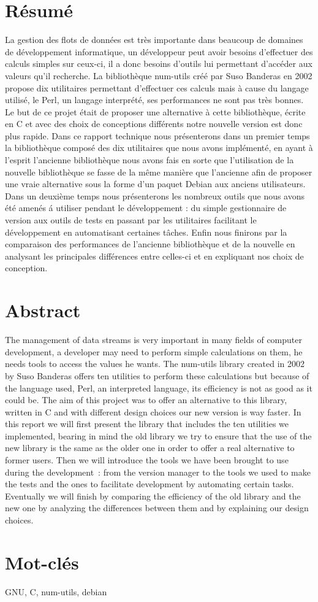 \section*{R\'esum\'e}

La gestion des flots de donn\'ees est tr\`es importante dans beaucoup de domaines de d\'eveloppement informatique, un d\'eveloppeur peut avoir besoins d'effectuer des calculs simples sur ceux-ci, il a donc besoins d'outils lui permettant d'acc\'eder aux valeurs qu'il recherche. La biblioth\`eque num-utils cr\'e\'e par Suso Banderas en 2002 propose dix utilitaires permettant d'effectuer ces calculs mais \`a cause du langage utilis\'e, le Perl, un langage interpr\'et\'e, ses performances ne sont pas tr\`es bonnes. Le but de ce projet \'etait de proposer une alternative \`a cette biblioth\`eque, \'ecrite en C et avec des choix de conceptions diff\'erents notre nouvelle version est donc plus rapide. Dans ce rapport technique nous pr\'esenterons dans un premier temps la biblioth\`eque compos\'e des dix utilitaires que nous avons impl\'ement\'e, en ayant \`a l'esprit l'ancienne biblioth\`eque nous avons fais en sorte que l'utilisation de la nouvelle biblioth\`eque se fasse de la m\^eme mani\`ere que l'ancienne afin de proposer une vraie alternative sous la forme d'un paquet Debian aux anciens utilisateurs. Dans un deuxi\`eme temps nous pr\'esenterons les nombreux outils que nous avons \'et\'e amen\'es \'a utiliser pendant le d\'eveloppement : du simple gestionnaire de version aux outils de tests en passant par les utilitaires facilitant le d\'eveloppement en automatisant certaines t\^aches. Enfin nous finirons par la comparaison des performances de l'ancienne biblioth\`eque et de la nouvelle en analysant les principales diff\'erences entre celles-ci et en expliquant nos choix de conception.

\section*{Abstract}

The management of data streams is very important in many fields of computer development, a developer may need to perform simple calculations on them, he needs tools to access the values he wants. The num-utils library created in 2002 by Suso Banderas offers ten utilities to perform these calculations but because of the language used, Perl, an interpreted language, its efficiency is not as good as it could be. The aim of this project was to offer an alternative to this library, written in C and with different design choices our new version is way faster. In this report we will first present  the library that includes the ten utilities we implemented, bearing in mind the old library we try to ensure that the use of the new library is the same as the older one in order to offer a real alternative to former users. Then we will introduce the tools we have been brought to use during the development : from the version manager to the tools we used to make the tests and the ones to facilitate development by automating certain tasks. Eventually we will finish by comparing the efficiency of the old library and the new one by analyzing the differences between them and by explaining our design choices.

\section*{Mot-cl\'es}

GNU, C, num-utils, debian
